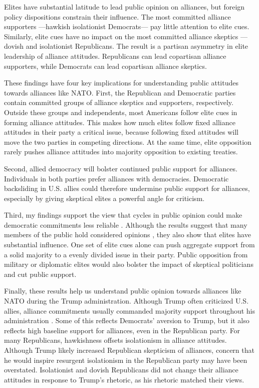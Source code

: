 \documentclass[12pt]{article}
\begin{document}
Elites have substantial latitude to lead public opinion on alliances, but foreign policy dispositions constrain their influence. 
The most committed alliance supporters ---hawkish isolationist Democrats--- pay little attention to elite cues.
Similarly, elite cues have no impact on the most committed alliance skeptics --- dovish and isolationist Republicans. 
The result is a partisan asymmetry in elite leadership of alliance attitudes. 
Republicans can lead copartisan alliance supporters, while Democrats can lead copartisan alliance skeptics. 


These findings have four key implications for understanding public attitudes towards alliances like NATO. 
First, the Republican and Democratic parties contain committed groups of alliance skeptics and supporters, respectively.
Outside these groups and independents, most Americans follow elite cues in forming alliance attitudes. 
This makes how much elites follow fixed alliance attitudes in their party a critical issue, because following fixed attitudes will move the two parties in competing directions. 
At the same time, elite opposition rarely pushes alliance attitudes into majority opposition to existing treaties. 


Second, allied democracy will bolster continued public support for alliances.
Individuals in both parties prefer alliances with democracies. 
Democratic backsliding in U.S. allies could therefore undermine public support for alliances, especially by giving skeptical elites a powerful angle for criticism. 


Third, my findings support the view that cycles in public opinion could make democratic commitments less reliable \citep{GartzkeGleditsch2004}. 
Although the results suggest that many members of the public hold considered opinions \citep{PageShapiro1992}, they also show that elites have substantial influence. 
One set of elite cues alone can push aggregate support from a solid majority to a evenly divided issue in their party.
Public opposition from military or diplomatic elites would also bolster the impact of skeptical politicians and cut public support. 


Finally, these results help us understand public opinion towards alliances like NATO during the Trump administration.
Although Trump often criticized U.S. allies, alliance commitments usually commanded majority support throughout his administration \citep{PewNATO2020}. 
Some of this reflects Democrats' aversion to Trump, but it also reflects high baseline support for alliances, even in the Republican party.  
For many Republicans, hawkishness offsets isolationism in alliance attitudes.
Although Trump likely increased Republican skepticism of alliances, concern that he would inspire resurgent isolationism in the Republican party may have been overstated.
Isolationist and dovish Republicans did not change their alliance attitudes in response to Trump's rhetoric, as his rhetoric matched their views. 
\end{document}

